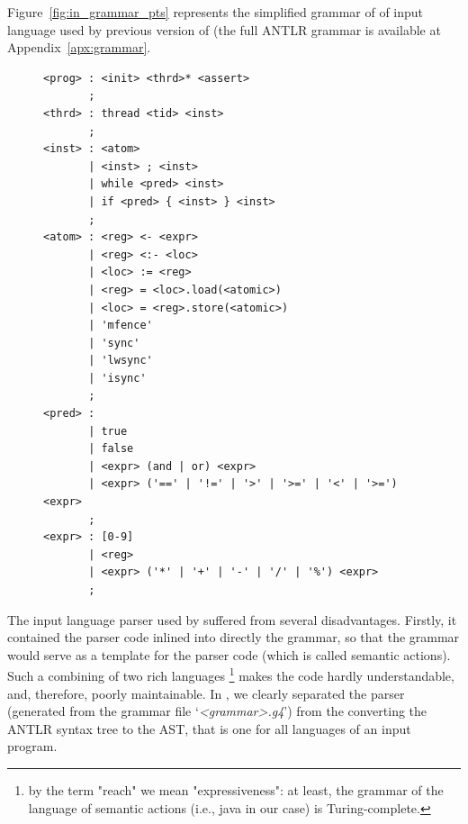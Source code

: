 Figure~\ref{fig:in_grammar_pts} represents the simplified grammar of of input language used by previous version of \porthos{} (the full ANTLR grammar is available at Appendix~\ref{apx:grammar}.

\begin{figure}[h]%
\centering
\begin{lstlisting}[mathescape=true,%
                  caption={The sketch of the input language grammar used by \oldporthos},%
                  label={fig:in_grammar_pts},%
                  morekeywords={if,then,else,return,while,program,thread},%
                  breaklines=true,%
                  basicstyle=\ttfamily\scriptsize]
<prog> : <init> <thrd>* <assert>
       ;
<thrd> : thread <tid> <inst>
       ;
<inst> : <atom>
       | <inst> ; <inst>
       | while <pred> <inst>
       | if <pred> { <inst> } <inst>
       ;
<atom> : <reg> <- <expr>
       | <reg> <:- <loc>
       | <loc> := <reg>
       | <reg> = <loc>.load(<atomic>)
       | <loc> = <reg>.store(<atomic>)
       | 'mfence'
       | 'sync'
       | 'lwsync'
       | 'isync'
       ;
<pred> :
       | true
       | false
       | <expr> (and | or) <expr>
       | <expr> ('==' | '!=' | '>' | '>=' | '<' | '>=') <expr>
       ;
<expr> : [0-9]
       | <reg>
       | <expr> ('*' | '+' | '-' | '/' | '%') <expr>
       ;
\end{lstlisting}
\end{figure}

The input language parser used by \porthos[1] suffered from several disadvantages.
Firstly, it contained the parser code inlined into directly the grammar, so that the grammar would serve as a template for the parser code (which is called semantic actions). Such a combining of two rich languages%
\footnote{by the term "reach" we mean "expressiveness": at least, the grammar of the language of semantic actions (i.e., java in our case) is Turing-complete.} %
makes the code hardly understandable, and, therefore, poorly maintainable. In \porthos[2], we clearly separated the parser (generated from the grammar file `\textit{<grammar>.g4}') from the converting the ANTLR syntax tree to the AST, that is one for all  languages of an input program.

